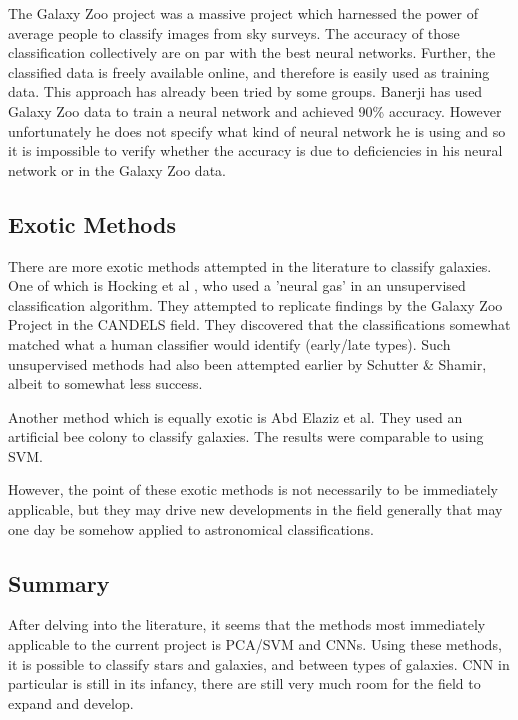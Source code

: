 \documentclass[a4paper,11pt]{article}
\begin{document}
The Galaxy Zoo project was a massive project which harnessed the power of average people to classify images from sky surveys. The accuracy of those classification collectively are on par with the best neural networks. Further, the classified data is freely available online, and therefore is easily used as training data. This approach has already been tried by some groups. Banerji has used Galaxy Zoo data to train a neural network and achieved 90\% accuracy. \cite{banerji_2010_galaxy} However unfortunately he does not specify what kind of neural network he is using and so it is impossible to verify whether the accuracy is due to deficiencies in his neural network or in the Galaxy Zoo data. 

\subsection{Exotic Methods}
There are more exotic methods attempted in the literature to classify galaxies. One of which is Hocking et al \cite{hocking_2017_an} , who used a 'neural gas' in an unsupervised classification algorithm. They attempted to replicate findings by the Galaxy Zoo Project in the CANDELS field. They discovered that the classifications somewhat matched what a human classifier would identify (early/late types). Such unsupervised methods had also been attempted earlier by Schutter \& Shamir, \cite{banerji_2010_galaxy} albeit to somewhat less success. 

Another method which is equally exotic is Abd Elaziz et al. They used an artificial bee colony to classify galaxies. \cite{abdelaziz_2018_galaxies} The results were comparable to using SVM. 

However, the point of these exotic methods is not necessarily to be immediately applicable, but they may drive new developments in the field generally that may one day be somehow applied to astronomical classifications.

\subsection{Summary}
After delving into the literature, it seems that the methods most immediately applicable to the current project is PCA/SVM and CNNs. Using these methods, it is possible to classify stars and galaxies, and between types of galaxies. CNN in particular is still in its infancy, there are still very much room for the field to expand and develop. 

\newpage
\end{document}
